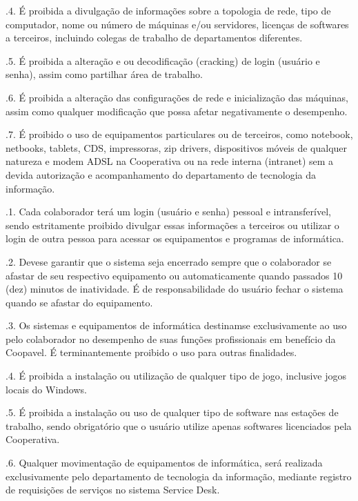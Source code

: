 \documentclass[letterpaper,10pt,portuges]{sphinxmanual}
\begin{document}
.4. É proibida a divulgação de informações sobre a topologia de rede, tipo de
computador, nome ou número de máquinas e/ou servidores, licenças de softwares a
terceiros, incluindo colegas de trabalho de departamentos diferentes.

.5. É proibida a alteração e ou decodificação (cracking) de login (usuário e senha),
assim como partilhar área de trabalho.

.6. É proibida a alteração das configurações de rede e inicialização das máquinas,
assim como qualquer modificação que possa afetar negativamente o desempenho.

.7. É proibido o uso de equipamentos particulares ou de terceiros, como notebook,
netbooks, tablets, CDS, impressoras, zip drivers, dispositivos móveis de qualquer
natureza e modem ADSL na Cooperativa ou na rede interna (intranet) sem a devida
autorização e acompanhamento do departamento de tecnologia da informação.

.1. Cada colaborador terá um login (usuário e senha) pessoal e intransferível, sendo
estritamente proibido divulgar essas informações a terceiros ou utilizar o login de outra
pessoa para acessar os equipamentos e programas de informática.

.2. Deve\sphinxhyphen{}se garantir que o sistema seja encerrado sempre que o colaborador se afastar
de seu respectivo equipamento ou automaticamente quando passados 10 (dez) minutos de
inatividade. É de responsabilidade do usuário fechar o sistema quando se afastar do
equipamento.

.3. Os sistemas e equipamentos de informática destinam\sphinxhyphen{}se exclusivamente ao uso pelo
colaborador no desempenho de suas funções profissionais em benefício da Coopavel. É
terminantemente proibido o uso para outras finalidades.

.4. É proibida a instalação ou utilização de qualquer tipo de jogo, inclusive jogos locais
do Windows.

.5. É proibida a instalação ou uso de qualquer tipo de software nas estações de trabalho,
sendo obrigatório que o usuário utilize apenas softwares licenciados pela Cooperativa.

.6. Qualquer movimentação de equipamentos de informática, será realizada
exclusivamente pelo departamento de tecnologia da informação, mediante registro de
requisições de serviços no sistema Service Desk.
\end{document}
